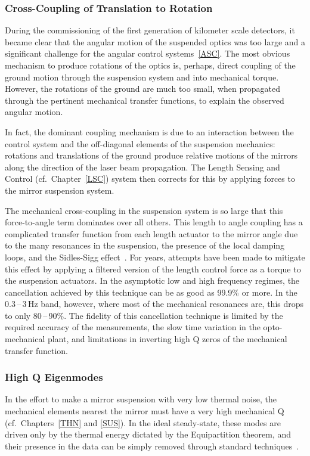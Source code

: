 \subsubsection{Cross-Coupling of Translation to Rotation}
During the commissioning of the first generation of kilometer scale detectors, it became clear that the angular motion of the suspended optics was too large and a significant challenge for the angular control systems~\ref{ASC}. The most obvious mechanism to produce rotations of the optics is, perhaps, direct coupling of the ground motion through the suspension system and into mechanical torque. However, the rotations of the ground are much too small, when propagated through the pertinent mechanical transfer functions, to explain the observed angular motion.

In fact, the dominant coupling mechanism is due to an interaction between the control system and the off-diagonal elements of the suspension mechanics: rotations and translations of the ground produce relative motions of the mirrors along the direction of the laser beam propagation. The Length Sensing and Control (cf.~Chapter~\ref{LSC}) system then corrects for this by applying forces to the mirror suspension system.

The mechanical cross-coupling in the suspension system is so large that this force-to-angle term dominates over all others. This length to angle coupling has a complicated transfer function from each length actuator to the mirror angle due to the many resonances in the suspension, the presence of the local damping loops, and the Sidles-Sigg effect~\cite{Sidles:2006un, Hirose:10, Dooley:13}. For years, attempts have been made to mitigate this effect by applying a filtered version of the length control force as a torque to the suspension actuators. In the asymptotic low and high frequency regimes, the cancellation achieved by this technique can be as good as 99.9\% or more.
In the 0.3\,--\,3\,Hz band, however, where most of the mechanical resonances are,
this drops to only 80\,--\,90\%. The fidelity of this cancellation technique is limited by the required accuracy of the measurements, the slow time variation in the opto-mechanical plant, and limitations in inverting high Q zeros of the mechanical transfer function.


\subsubsection{High Q Eigenmodes}
In the effort to make a mirror suspension with very low thermal noise, the mechanical
elements nearest the mirror must have a very high mechanical Q
(cf.~Chapters~\ref{THN} and \ref{SUS}).
In the ideal steady-state, these modes are driven only by the thermal energy
dictated by the Equipartition theorem, and their presence in the data can be simply removed through standard techniques~\cite{Allen:1999wy, Finn:Violins, Searle:2003ib, Sintes:1998gq}.

